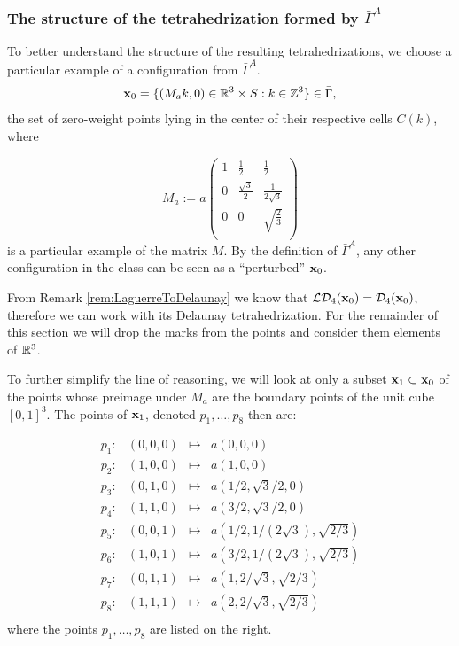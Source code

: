 \subsubsection{The structure of the tetrahedrization formed by $\bar\Gamma^A$}
To better understand the structure of the resulting tetrahedrizations, we choose a particular example of a configuration from $\bar\Gamma^A$. 
$${\mathbf{x}}_0 = \{(M_ak,0) \in {\mathbb R^3}\times S: k \in \mathbb Z^3\} \in \bar\Gamma,$$ 
the set of zero-weight points lying in the center of their respective cells $C(k)$, where

$$
M_a := a \begin{pmatrix}
1 & \frac 12 & \frac 12 \\
0 & \frac {\sqrt{3}}2 & \frac 1{2\sqrt{3}}  \\
0 & 0 & \sqrt{\frac 23} \\
\end{pmatrix}
$$
is a particular example of the matrix $M$. By the definition of $\bar\Gamma^A$, any other configuration in the class can be seen as a ``perturbed'' ${\mathbf{x}}_0$.\newline

\noindent From Remark \ref{rem:LaguerreToDelaunay} we know that $\mathcal {LD}_4({\mathbf{x}}_0) = \mathcal D_4({\mathbf{x}}_0)$, therefore we can work with its Delaunay tetrahedrization. For the remainder of this section we will drop the marks from the points and consider them elements of ${\mathbb R^3}$.

To further simplify the line of reasoning, we will look at only a subset ${\mathbf{x}}_1\subset {\mathbf{x}}_0$ of the points whose preimage under $M_a$ are the boundary points of the unit cube $[0,1]^3$. The points of ${\mathbf{x}}_1$, denoted $p_1, \dots, p_8$ then are:

$$\begin{matrix}
	p_1: & (0,0,0) & \longmapsto & a(0,0,0) \\
	p_2: & (1,0,0) & \longmapsto & a(1,0,0)\\
	p_3: & (0,1,0) & \longmapsto & a(1/2,\sqrt{3}/2,0)\\
	p_4: & (1,1,0) & \longmapsto & a(3/2,\sqrt{3}/2,0)\\

	p_5: & (0,0,1) & \longmapsto & a(1/2,1/(2\sqrt{3}),\sqrt{2/3})\\
	p_6: & (1,0,1) & \longmapsto & a(3/2,1/(2\sqrt{3}),\sqrt{2/3})\\
	p_7: & (0,1,1) & \longmapsto & a(1,2/\sqrt3, \sqrt{2/3})\\
	p_8: & (1,1,1) & \longmapsto & a(2,2/\sqrt3, \sqrt{2/3})\\
\end{matrix}$$
where the points $p_1,\dots, p_8$ are listed on the right. \newline

